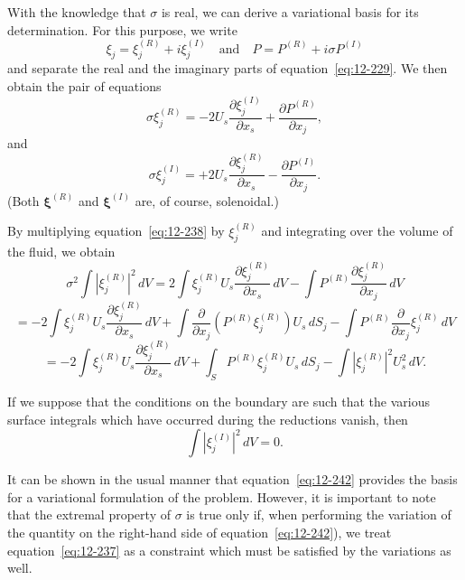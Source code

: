 With the knowledge that $\sigma$ is real, we can derive a variational basis for its determination. For this purpose, we write
\begin{equation}
\label{eq:12-236}
\xi_j = \xi_j^{(R)} + i\xi_j^{(I)} \quad \text{and} \quad P = P^{(R)} + i\sigma P^{(I)}
\end{equation}
and separate the real and the imaginary parts of equation~\eqref{eq:12-229}. We then obtain the pair of equations
\begin{equation}
\label{eq:12-237}
\sigma\xi_j^{(R)} = -2U_s\frac{\partial \xi_j^{(I)}}{\partial x_s} + \frac{\partial P^{(R)}}{\partial x_j},
\end{equation}
and
\begin{equation}
\label{eq:12-238}
\sigma\xi_j^{(I)} = +2U_s\frac{\partial \xi_j^{(R)}}{\partial x_s} - \frac{\partial P^{(I)}}{\partial x_j}.
\end{equation}
(Both $\boldsymbol\xi^{(R)}$ and $\boldsymbol\xi^{(I)}$ are, of course, solenoidal.)

By multiplying equation~\eqref{eq:12-238} by $\xi_j^{(R)}$ and integrating over the volume of the fluid, we obtain
\begin{equation}
\label{eq:12-239}
\sigma^2 \int |\xi_j^{(R)}|^2 \, dV = 2 \int \xi_j^{(R)} U_s \frac{\partial \xi_j^{(R)}}{\partial x_s} \, dV - \int P^{(R)} \frac{\partial \xi_j^{(R)}}{\partial x_j}\, dV
\end{equation}
\begin{equation}
\label{eq:12-240}
= -2 \int \xi_j^{(R)} U_s \frac{\partial \xi_j^{(R)}}{\partial x_s}\,dV + \int \frac{\partial}{\partial x_j}(P^{(R)}\xi_j^{(R)}) U_s\,dS_j - \int P^{(R)}\frac{\partial}{\partial x_j}\xi_j^{(R)} \, dV
\end{equation}
\begin{equation}
\label{eq:12-241}
= -2 \int \xi_j^{(R)} U_s \frac{\partial \xi_j^{(R)}}{\partial x_s}\,dV + \int_S P^{(R)}\xi_j^{(R)} U_s\,dS_j - \int |\xi_j^{(R)}|^2 U_s^2 \, dV.
\end{equation}

If we suppose that the conditions on the boundary are such that the various surface integrals which have occurred during the reductions vanish, then
\begin{equation}
\label{eq:12-242}
\int |\xi_j^{(I)}|^2\,dV = 0.
\end{equation}

It can be shown in the usual manner that equation~\eqref{eq:12-242} provides the basis for a variational formulation of the problem. However, it is important to note that the extremal property of $\sigma$ is true only if, when performing the variation of the quantity on the right-hand side of equation~\eqref{eq:12-242}), we treat equation~\eqref{eq:12-237} as a constraint which must be satisfied by the variations as well.

